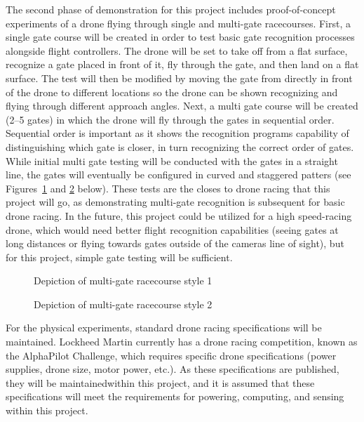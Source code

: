 \documentclass[onecolumn,10pt]{IEEEtran}
\begin{document}
The second phase of demonstration for this project includes proof-of-concept experiments of a drone flying through single and multi-gate racecourses. First, a single gate course will be created in order to test basic gate recognition processes alongside flight controllers. The drone will be set to take off from a flat surface, recognize a gate placed in front of it, fly through the gate, and then land on a flat surface. The test will then be modified by moving the gate from directly in front of the drone to different locations so the drone can be shown recognizing and flying through different approach angles. Next, a multi gate course will be created (2--5 gates) in which the drone will fly through the gates in sequential order. Sequential order is important as it shows the recognition programs capability of distinguishing which gate is closer, in turn recognizing the correct order of gates. While initial multi gate testing will be conducted with the gates in a straight line, the gates will eventually be configured in curved and staggered patters (see Figures~\ref{fig-gate-style-1} and \ref{fig-gate-style-2} below). These tests are the closes to drone racing that this project will go, as demonstrating multi-gate recognition is subsequent for basic drone racing. In the future, this project could be utilized for a high speed-racing drone, which would need better flight recognition capabilities (seeing gates at long distances or flying towards gates outside of the cameras line of sight), but for this project, simple gate testing will be sufficient.
\begin{figure}
\caption{Depiction of multi-gate racecourse style 1}
\label{fig-gate-style-1}
\end{figure}

\begin{figure}
\caption{Depiction of multi-gate racecourse style 2}
\label{fig-gate-style-2}
\end{figure}

For the physical experiments, standard drone racing specifications will be maintained. Lockheed Martin currently has a drone racing competition, known as the AlphaPilot Challenge, which requires specific drone specifications (power supplies, drone size, motor power, etc.). As these specifications are published, they will be maintainedwithin this project, and it is assumed that these specifications will meet the requirements for powering, computing, and sensing within this project.
\end{document}
